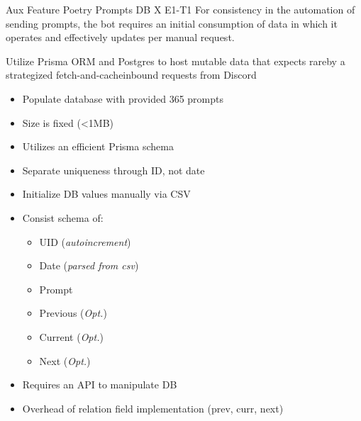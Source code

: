 \documentclass[7px]{article}
\begin{document}
\frontmatter
{Aux Feature}
{Poetry Prompts DB}
{X}
{E1-T1}
{For consistency in the automation of sending prompts, the bot requires an initial consumption of data in which it operates and effectively updates per manual request.}

\strategy
{
  Utilize Prisma ORM and Postgres to host mutable data that expects rare{\textemdash}by a strategized fetch-and-cache{\textemdash}inbound requests from Discord
}
{
  \begin{enumerate}
    \small
    \begin{itemize}[label=$\multimapdotinv$, leftmargin=1.7mm]
      \item Populate database with provided 365 prompts
      \item Size is fixed (<1MB)
      \item Utilizes an efficient Prisma schema
      \item Separate uniqueness through ID, not date
    \end{itemize}
    \normalsize
\end{enumerate}
}
{
  \small
  \begin{itemize}[label=$\multimapdotinv$]
    \item Initialize DB values manually via CSV
    \item Consist schema of:
      \footnotesize{
        \begin{itemize}[label=\bullet]
          \item UID (\textit{autoincrement})
          \item Date (\textit{parsed from csv})
          \item Prompt
          \item Previous (\textit{Opt.})
          \item Current (\textit{Opt.})
          \item Next (\textit{Opt.})
        \end{itemize}
      }
  \end{itemize}
  \normalsize
}
{
  \small
  \begin{itemize}[label=\opentimes]
    \item Requires an API to manipulate DB
    \item Overhead of relation field implementation (prev, curr, next)
  \end{itemize}
  \normalsize
}
\end{document}
